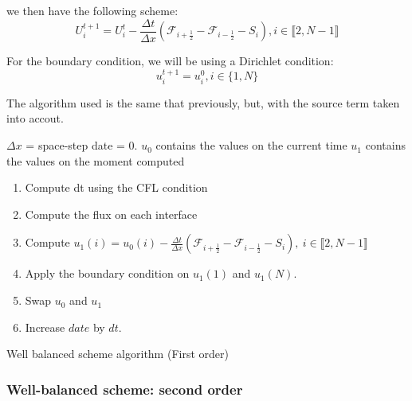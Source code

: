         we then have the following scheme:
        \begin{equation}
            U_i^{t+1} = U_i^t - \frac{\Delta t}{\Delta x}(\mathcal{F}_{i+\frac{1}{2}} - \mathcal{F}_{i-\frac{1}{2}} - S_i),i\in\llbracket2,N-1\rrbracket
        \end{equation}
        
        For the boundary condition, we will be using a Dirichlet condition:
        \begin{equation}
             u^{t+1}_i= u_i^0, i \in\{1,N\}
        \end{equation}
        
        The algorithm used is the same that previously, but, with the source term taken into accout.
        
        \begin{algorithm}[h]
            $\Delta x$ = space-step\;
            date = 0.
            $u_0$ contains the values on the current time
            $u_1$ contains the values on the moment computed
            
            {
                 \begin{enumerate}
                     \item Compute dt using the CFL condition
                     \item Compute the flux on each interface
                     \item Compute $u_1(i)=u_0(i) - \frac{\Delta t}{\Delta x}(\mathcal{F}_{i+\frac{1}{2}} - \mathcal{F}_{i-\frac{1}{2} }-S_i),~ i\in \llbracket 2,N-1 \rrbracket$
                     \item Apply the boundary condition on $u_1\left(1\right)$ and $u_1\left(N\right)$.
                     \item Swap $ u_0$ and $u_1$
                     \item Increase $date$ by $dt$.
                 \end{enumerate}
            }
        \caption{Well balanced scheme algorithm (First order)}
        \end{algorithm}




        \subsubsection{Well-balanced scheme: second order}
        
